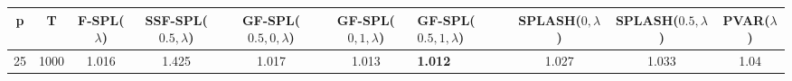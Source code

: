 \begin{tabular}{cccccclccc}
\hline
  p  &  T   &  F-SPL($\lambda$)  &  SSF-SPL($0.5, \lambda$)  &  GF-SPL($0.5, 0, \lambda$)  &  GF-SPL($0, 1, \lambda$)  & GF-SPL($0.5, 1, \lambda$)   &  SPLASH($0, \lambda$)  &  SPLASH($0.5, \lambda$)  &  PVAR($\lambda$)  \\
\hline
 25  & 1000 &       1.016        &           1.425           &            1.017            &           1.013           & \textbf{1.012}              &         1.027          &          1.033           &       1.04        \\
\hline
\end{tabular}